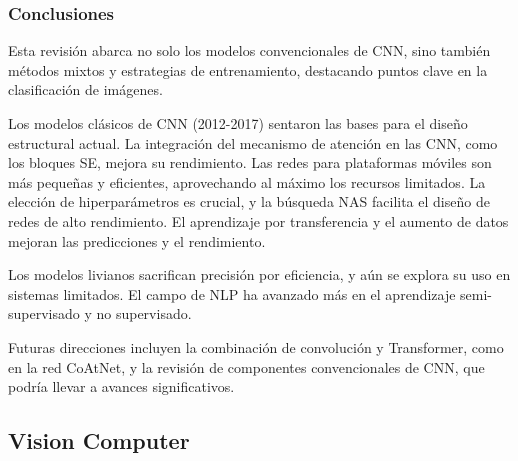  \subsubsection{Conclusiones} 
Esta revisión abarca no solo los modelos convencionales de CNN, sino también métodos mixtos y estrategias de entrenamiento, destacando puntos clave en la clasificación de imágenes.

Los modelos clásicos de CNN (2012-2017) sentaron las bases para el diseño estructural actual. La integración del mecanismo de atención en las CNN, como los bloques SE, mejora su rendimiento. Las redes para plataformas móviles son más pequeñas y eficientes, aprovechando al máximo los recursos limitados. La elección de hiperparámetros es crucial, y la búsqueda NAS facilita el diseño de redes de alto rendimiento. El aprendizaje por transferencia y el aumento de datos mejoran las predicciones y el rendimiento.

Los modelos livianos sacrifican precisión por eficiencia, y aún se explora su uso en sistemas limitados. El campo de NLP ha avanzado más en el aprendizaje semi-supervisado y no supervisado.

Futuras direcciones incluyen la combinación de convolución y Transformer, como en la red CoAtNet, y la revisión de componentes convencionales de CNN, que podría llevar a avances significativos.
 \subsection{Vision Computer}
 
